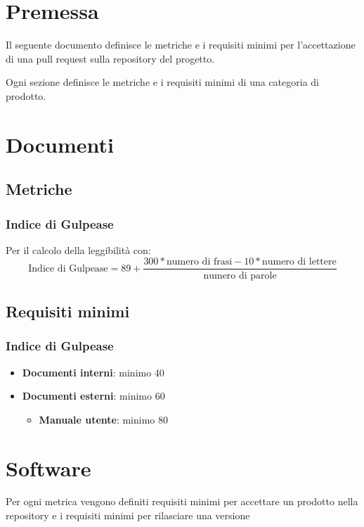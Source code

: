 \documentclass[a4paper, 12pt]{article}
\begin{document}
\makefrontpage

\makeversioni

\section{Premessa}
Il seguente documento definisce le metriche e i requisiti minimi per l'accettazione di una pull request sulla repository del progetto. 

Ogni sezione definisce le metriche e i requisiti minimi di una categoria di prodotto.

\section{Documenti}
\subsection{Metriche}
\subsubsection{Indice di Gulpease}
Per il calcolo della leggibilità con:
\[ \text{Indice di Gulpease} = 89 + \frac{300*\text{numero di frasi} - 10*\text{numero di lettere}}{\text{numero di parole}} \]


\subsection{Requisiti minimi}
\subsubsection{Indice di Gulpease}
\begin{itemize}
	\item \textbf{Documenti interni}: minimo 40
	\item \textbf{Documenti esterni}: minimo 60
	\begin{itemize}
		\item \textbf{Manuale utente}: minimo 80
	\end{itemize}
\end{itemize}

\section{Software}
Per ogni metrica vengono definiti requisiti minimi per accettare un prodotto nella repository e i requisiti minimi per rilasciare una versione
	
\end{document}
